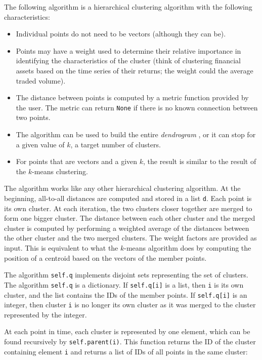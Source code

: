 \documentclass[justified, sixbynine]{tufte-book}
\def\ft{\small\tt}
\theoremstyle{plain}%
\newtheorem * {corollary}{Corollary}
\theoremstyle{definition}
\theoremstyle{remark}
\newtheorem * {remark}{Remark}
\newtheorem * {note}{Note}
\begin{document}
\begin{fullwidth}
The following algorithm is a hierarchical clustering algorithm with the following characteristics:

\begin{itemize}
\item Individual points do not need to be vectors (although they can be).
\item Points may have a weight used to determine their relative importance in identifying the characteristics of the cluster (think of clustering financial assets based on the time series of their returns; the weight could the average traded volume).
\item The distance between points is computed by a metric function provided by the user. The metric can return {\ft None} if there is no known connection between two points.
\item The algorithm can be used to build the entire {\it dendrogram} , or it can stop for a given value of $k$, a target number of clusters.
\item For points that are vectors and a given $k$, the result is similar to the result of the $k$-means clustering.
\end{itemize}

The algorithm works like any other hierarchical clustering algorithm. At the beginning, all-to-all distances are computed and stored in a list {\ft d}. Each point is its own cluster. At each iteration, the two clusters closer together are merged to form one bigger cluster. The distance between each other cluster and the merged cluster is computed by performing a weighted average of the distances between the other cluster and the two merged clusters. The weight factors are provided as input. This is equivalent to what the $k$-means algorithm does by computing the position of a centroid based on the vectors of the member points.

The algorithm {\ft self.q} implements disjoint sets representing the set of clusters. The algorithm {\ft self.q} is a dictionary. If {\ft self.q[i]} is a list, then {\ft i} is its own cluster, and the list contains the IDs of the member points. If  {\ft self.q[i]} is an integer, then cluster {\ft i} is no longer its own cluster as it was merged to the cluster represented by the integer.

At each point in time, each cluster is represented by one element, which can be found recursively by {\ft self.parent(i)}. This function returns the ID of the cluster containing element {\ft i} and returns a list of IDs of all points in the same cluster:


\end{fullwidth}
\end{document}
